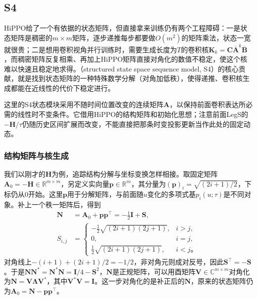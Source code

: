 \subsection{S4}
\label{sec:rnn-s4}

HiPPO给了一个有依据的状态矩阵，但直接拿来训练仍有两个工程障碍：一是状态矩阵是稠密的$m\times m$矩阵，逐步递推每步都要做$O(m^2)$的矩阵乘法，状态一宽就很贵；二是想用卷积视角并行训练时，需要生成长度为$T$的卷积核$\bm K_k=\bm C\overline{\bm A}^k\overline{\bm B}$，而稠密矩阵反复相乘、再加上HiPPO矩阵直接对角化的数值不稳定，使这个核难以快速且稳定地求得。（structured state space sequence model, S4）的核心贡献，就是找到状态矩阵的一种特殊数学分解（对角加低秩），使得递推、卷积核生成都能在近线性的代价下稳定进行。

这里的S4状态模块采用不随时间位置改变的连续矩阵$\bm A$，以保持前面卷积表达所必需的线性时不变条件。它借用HiPPO的结构矩阵和初始化思想；注意前面LegS的$-\bm H/\tau$仍随历史区间扩展而改变，不能直接把那条时变投影更新当作此处的固定动态。

\subsubsection{结构矩阵与核生成}
\label{sec:rnn-s4-structure}

我们以刚才的$\bm H$为例，追踪结构分解与坐标变换怎样相接。取固定矩阵$\bm A_0=-\bm H\in\mathbb R^{m\times m}$，另定义实向量$\bm p\in\mathbb R^m$，其分量为$(\bm p)_i=\sqrt{(2i+1)/2}$，下标仍从0开始。这里$\bm p$用于分解矩阵，与前面随$u$变化的多项式基$p_i(u;\tau)$是不同对象。补上一个秩一矩阵后，得到
\[
  \begin{aligned}
    \bm N&=\bm A_0+\bm p\bm p^{\top}
      =-\frac12\bm I+\bm S,\\
    S_{i,j}&=
      \begin{cases}
        -\tfrac12\sqrt{(2i+1)(2j+1)},&i>j,\\
        0,&i=j,\\
        \tfrac12\sqrt{(2i+1)(2j+1)},&i<j\text{。}
      \end{cases}
  \end{aligned}
\]
对角线上$-(i+1)+(2i+1)/2=-1/2$，非对角元则成对反号，因此$\bm S^{\top}=-\bm S$。于是$\bm N\bm N^*=\bm N^*\bm N=\bm I/4-\bm S^2$，$\bm N$是正规矩阵，可以用酉矩阵$\bm V\in\mathbb C^{m\times m}$对角化为$\bm N=\bm V\bm\Lambda\bm V^*$，其中$\bm V^*\bm V=\bm I$。这一步对角化的是补正后的$\bm N$，原来的状态矩阵仍为$\bm A_0=\bm N-\bm p\bm p^{\top}$。

